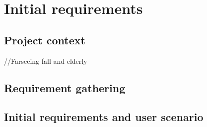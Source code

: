 \chapter{Initial requirements}


\section{Project context}
//Farseeing fall and elderly

\section{Requirement gathering}

\section{Initial requirements and user scenario}
